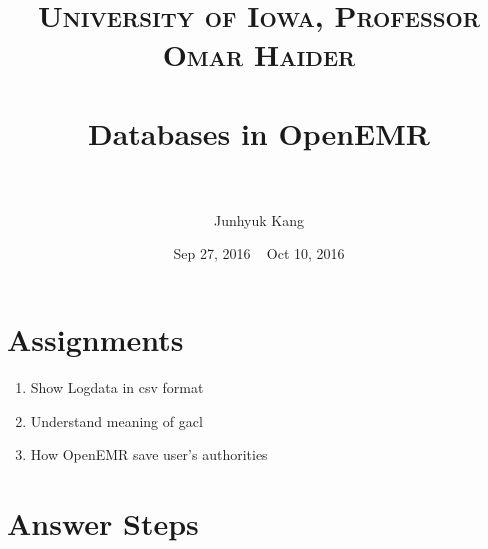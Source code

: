 \documentclass[paper=a4, fontsize=11pt]{scrartcl} %
\title{	
\normalfont \normalsize 
\textsc{University of Iowa, Professor Omar Haider} \\ [25pt] %
\horrule{0.5pt} \\[0.4cm] %
\huge Databases in OpenEMR \\ %
\horrule{2pt} \\[0.5cm] %
}
\author{Junhyuk Kang} %
\date{Sep 27, 2016 ~ Oct 10, 2016 } %
\numberwithin{equation}{section} %
\numberwithin{figure}{section} %
\numberwithin{table}{section} %
\begin{document}
\maketitle %

\section{Assignments}
\begin{enumerate}
  \item Show Logdata in csv format
  \item Understand meaning of gacl
  \item How OpenEMR save user's authorities
\end{enumerate}

\section{Answer Steps}
\end{document}
